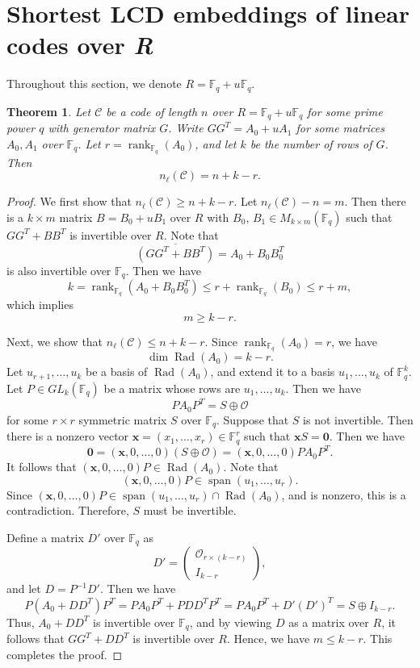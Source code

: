 \documentclass{article}
\newtheorem{theorem}{Theorem}[section]
\theoremstyle{definition}
\theoremstyle{remark}
\begin{document}
\section{Shortest LCD embeddings of linear codes over {\it R}}\label{sec6}
Throughout this section, we denote $R=\mathbb{F}_q+u\mathbb{F}_q$.

\begin{theorem}\label{LCD-exact}
    Let $\mathcal{C}$ be a code of length $n$ over $R=\mathbb{F}_q+u\mathbb{F}_q$ for some prime power $q$ with generator matrix $G$. Write $GG^T=A_0+uA_1$ for some matrices $A_0, A_1$ over $\mathbb{F}_q$. Let $r=\operatorname{rank}_{\mathbb{F}_q}(A_0)$, and let $k$ be the number of rows of $G$. Then
    \[
    n_\ell(\mathcal{C})=n+k-r.
    \]
\end{theorem}
\begin{proof}
    We first show that $n_\ell(\mathcal{C})\ge n+k-r$. Let $n_\ell(\mathcal{C})-n=m$. Then there is a $k\times m$ matrix $B=B_0+uB_1$ over $R$ with $B_0,\,B_1\in M_{k\times m}(\mathbb{F}_q)$ such that $GG^T+BB^T$ is invertible over $R$. Note that
    \[
    \overline{(GG^T+BB^T)}=A_0+B_0B_0^T
    \]
    is also invertible over $\mathbb{F}_q$. Then we have
    \[
    k=\operatorname{rank}_{\mathbb{F}_q}(A_0+B_0B_0^T)\le r+\operatorname{rank}_{\mathbb{F}_q}(B_0)\le r+m,
    \]
    which implies
    \[
    m\ge k-r.
    \]

    Next, we show that $n_\ell(\mathcal{C})\le n+k-r$. Since $\operatorname{rank}_{\mathbb{F}_q}(A_0)=r$, we have
    \[
    \dim\operatorname{Rad}(A_0)=k-r.
    \]
    Let $u_{r+1}, \ldots, u_k$ be a basis of $\operatorname{Rad}(A_0)$, and extend it to a basis $u_1, \ldots, u_k$ of $\mathbb{F}_q^k$. Let $P\in GL_k(\mathbb{F}_q)$ be a matrix whose rows are $u_1, \ldots, u_k$. Then we have
    \[
    PA_0P^T=S\oplus \mathcal{O}
    \]
    for some $r\times r$ symmetric matrix $S$ over $\mathbb{F}_q$. Suppose that $S$ is not invertible. Then there is a nonzero vector $\mathbf{x}=(x_1, \ldots, x_r)\in \mathbb{F}_q^r$ such that $\mathbf{x}S=\mathbf{0}$. Then we have
    \[
    \mathbf{0}=(\mathbf{x}, 0, \ldots, 0)(S\oplus \mathcal{O})=(\mathbf{x}, 0, \ldots, 0)PA_0P^T.
    \]
    It follows that $(\mathbf{x}, 0, \ldots, 0)P\in \operatorname{Rad}(A_0)$. Note that
    \[
    (\mathbf{x}, 0, \ldots, 0)P\in \operatorname{span}(u_1, \ldots, u_r).
    \]
    Since $(\mathbf{x}, 0, \ldots, 0)P\in \operatorname{span}(u_1, \ldots, u_r)\cap \operatorname{Rad}(A_0)$, and is nonzero, this is a contradiction. Therefore, $S$ must be invertible.

    Define a matrix $D'$ over $\mathbb{F}_q$ as
    \[
    D'=\begin{pmatrix}
        \mathcal{O}_{r\times (k-r)}\\I_{k-r}
    \end{pmatrix},
    \]
    and let $D=P^{-1}D'$. Then we have
    \[
    P(A_0+DD^T)P^T=PA_0P^T+PDD^TP^T=PA_0P^T+D'(D')^T=S\oplus I_{k-r}.
    \]
    Thus, $A_0+DD^T$ is invertible over $\mathbb{F}_q$, and by viewing $D$ as a matrix over $R$, it follows that $GG^T+DD^T$ is invertible over $R$. Hence, we have $m\le k-r$. This completes the proof.
\end{proof}
\end{document}
